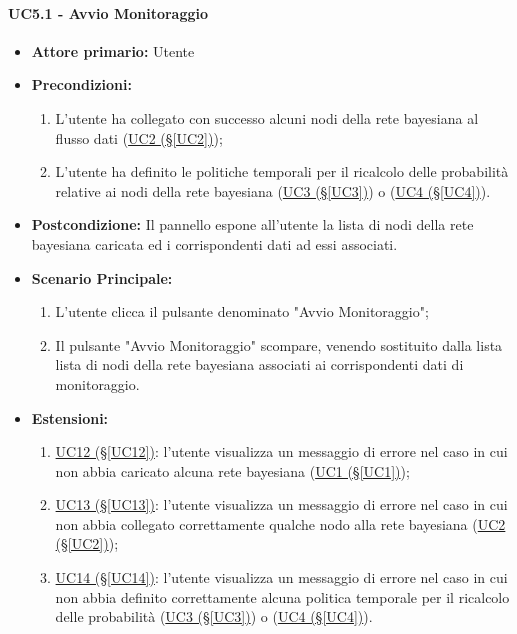 \paragraph{UC5.1 - Avvio Monitoraggio}\label{UC5.1}
\begin{itemize}
\item \textbf{Attore primario:} Utente
\item \textbf{Precondizioni:}
	\begin{enumerate}
	\item L'utente ha collegato con successo alcuni nodi della rete bayesiana al flusso dati (\hyperref[UC2]{UC2 					(§\ref*{UC2})});
	\item L'utente ha definito le politiche temporali per il ricalcolo delle probabilità relative ai nodi della rete 			bayesiana (\hyperref[UC3]{UC3 (§\ref*{UC3})}) o (\hyperref[UC4]{UC4 (§\ref*{UC4})}).
	\end{enumerate}
\item \textbf{Postcondizione:} Il pannello espone all'utente la lista di nodi della rete bayesiana caricata ed i 			corrispondenti dati ad essi associati.
\item \textbf{Scenario Principale:}
	\begin{enumerate}
	\item L'utente clicca il pulsante denominato "Avvio Monitoraggio";
	\item Il pulsante "Avvio Monitoraggio" scompare, venendo sostituito dalla lista lista di nodi della rete 							bayesiana associati ai corrispondenti dati di monitoraggio.
	\end{enumerate}
\item \textbf{Estensioni:}
	\begin{enumerate}
	\item \hyperref[UC12]{UC12 (§\ref*{UC12})}: l'utente visualizza un messaggio di errore nel caso in cui non abbia 			caricato alcuna rete bayesiana (\hyperref[UC1]{UC1 (§\ref*{UC1})});
	\item \hyperref[UC13]{UC13 (§\ref*{UC13})}: l'utente visualizza un messaggio di errore nel caso in cui non abbia 			collegato correttamente qualche nodo alla rete bayesiana (\hyperref[UC2]{UC2 (§\ref*{UC2})});
	\item \hyperref[UC14]{UC14 (§\ref*{UC14})}: l'utente visualizza un messaggio di errore nel caso in cui non abbia 			definito correttamente alcuna politica temporale per il ricalcolo delle probabilità (\hyperref[UC3]{UC3 							(§\ref*{UC3})}) o (\hyperref[UC4]{UC4 (§\ref*{UC4})}).
	\end{enumerate}
\end{itemize}

